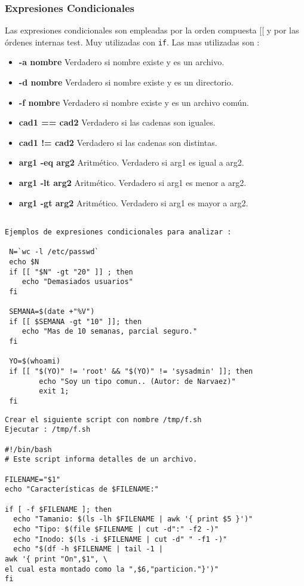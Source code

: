 \documentclass{beamer}
\begin{document}
\begin{frame}
\frametitle{Expresiones Condicionales}
Las expresiones condicionales son empleadas por la orden compuesta [[ y por las órdenes internas test. Muy utilizadas con \texttt{if}. Las mas utilizadas son :

\begin{itemize}
\item \textbf{-a nombre} Verdadero si nombre existe y es un archivo.
\item \textbf{-d nombre} Verdadero si nombre existe y es un directorio.
\item \textbf{-f nombre} Verdadero si nombre existe y es un archivo común.
\item \textbf{cad1 == cad2 } Verdadero si las cadenas son iguales.
\item \textbf{cad1 != cad2 } Verdadero si las cadenas son distintas.
\item \textbf{arg1 -eq arg2} Aritmético. Verdadero si arg1 es igual a arg2.
\item \textbf{arg1 -lt arg2} Aritmético. Verdadero si arg1 es menor a arg2.
\item \textbf{arg1 -gt arg2} Aritmético. Verdadero si arg1 es mayor a arg2.

\end{itemize}
\end{frame}

\begin{Verbatim}

Ejemplos de expresiones condicionales para analizar :

 N=`wc -l /etc/passwd`
 echo $N
 if [[ "$N" -gt "20" ]] ; then 
	echo "Demasiados usuarios"
 fi

 SEMANA=$(date +"%V")
 if [[ $SEMANA -gt "10" ]]; then
	echo "Mas de 10 semanas, parcial seguro."
 fi

 YO=$(whoami)
 if [[ "$(YO)" != 'root' && "$(YO)" != 'sysadmin' ]]; then
        echo "Soy un tipo comun.. (Autor: de Narvaez)"
        exit 1;
 fi

\end{Verbatim}


\begin{Verbatim}
Crear el siguiente script con nombre /tmp/f.sh
Ejecutar : /tmp/f.sh

#!/bin/bash
# Este script informa detalles de un archivo.

FILENAME="$1"
echo "Características de $FILENAME:"

if [ -f $FILENAME ]; then
  echo "Tamanio: $(ls -lh $FILENAME | awk '{ print $5 }')"
  echo "Tipo: $(file $FILENAME | cut -d":" -f2 -)"
  echo "Inodo: $(ls -i $FILENAME | cut -d" " -f1 -)"
  echo "$(df -h $FILENAME | tail -1 | 
awk '{ print "On",$1", \
el cual esta montado como la ",$6,"particion."}')"
fi
\end{Verbatim}
\end{document}
